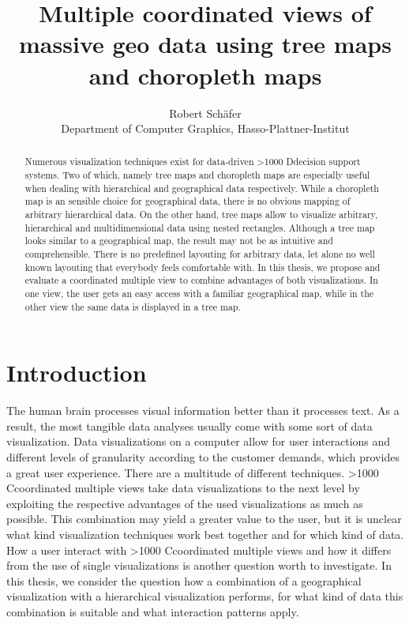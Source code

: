 \documentclass{article}
\newcommand\hmm[1]{\ifnum\ifhmode\spacefactor\else2000\fi>1000 \uppercase{#1}\else#1\fi}
\newcommand{\cmvs}{\hmm{c}oordinated multiple views}
\newcommand{\dss}{\hmm{d}ecision support systems}
\begin{document}
\title{Multiple coordinated views of massive geo data using tree maps and choropleth maps}
\author{Robert Schäfer\\ Department of Computer Graphics, Hasso-Plattner-Institut}
\maketitle
\clearpage

\tableofcontents
\clearpage
 


\begin{abstract}
  Numerous visualization techniques exist for data-driven \dss{}.
  Two of which, namely tree maps and choropleth maps are especially useful when dealing with hierarchical and geographical data respectively.
  While a choropleth map is an sensible choice for geographical data, there is no obvious mapping of arbitrary hierarchical data.
  On the other hand, tree maps allow to visualize arbitrary, hierarchical and multidimensional data using nested rectangles.
  Although a tree map looks similar to a geographical map, the result may not be as intuitive and comprehensible.
  There is no predefined layouting for arbitrary data, let alone no well known layouting that everybody feels comfortable with.
  In this thesis, we propose and evaluate a coordinated multiple view to combine advantages of both visualizations.
  In one view, the user gets an easy access with a familiar geographical map, while in the other view the same data is displayed in a tree map.
\end{abstract}
\clearpage

\section{Introduction}
The human brain processes visual information better than it processes text.
As a result, the most tangible data analyses usually come with some sort of data visualization.
Data visualizations on a computer allow for user interactions and different levels of granularity according to the customer demands, which provides a great user experience.
There are a multitude of different techniques.
\cmvs{} take data visualizations to the next level by exploiting the respective advantages of the used visualizations as much as possible.
This combination may yield a greater value to the user, but it is unclear what kind visualization techniques work best together and for which kind of data.
How a user interact with \cmvs{} and how it differs from the use of single visualizations is another question worth to investigate.
In this thesis, we consider the question how a combination of a geographical visualization with a hierarchical visualization performs, for what kind of data this combination is suitable and what interaction patterns apply.
\end{document}
